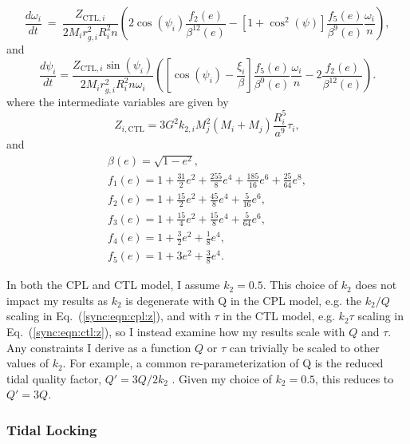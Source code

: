 \begin{equation}\label{sync:eqn:ctl:omega}
  \frac{d\omega_i}{dt} \ = \ \frac{Z_{\mathrm{CTL},i}}{2 M_i r_{g,i}^2 
R_i^2 n} \left( 2 \cos(\psi_i) \frac{f_2(e)}{\beta^{12}(e)} - \left[ 1+\cos^2(\psi)
 \right] \frac{f_5(e)}{\beta^9(e)} 
\frac{\omega_i}{n} \right),  
\end{equation}
and
\begin{equation}\label{sync:eqn:ctl:psi}
  \frac{d\psi_i}{dt} = \frac{Z_{\mathrm{CTL},i} \sin(\psi_i)}{2 M_i r_{g,i}^2 R_i^2 n \omega_i}\left( \left[ \cos(\psi_i) - \frac{\xi_i}{ \beta} \right] \frac{f_5(e)}{\beta^9(e)} \frac{\omega_i}{n} - 2 \frac{f_2(e)}{\beta^{12}(e)} \right).
\end{equation}
\normalsize
where the intermediate variables are given by 
\begin{equation}\label{sync:eqn:ctl:z}
 Z_{i,\mathrm{CTL}} = 3 G^2 k_{2,i} M_j^2 (M_i+M_j) \frac{R_i^5}{a^9} \tau_i ,
\end{equation}
and 
\begin{equation}\label{sync:eqn:ctl:f_e}
\begin{array}{l}
\beta(e) = \sqrt{1-e^2},\\
f_1(e) = 1 + \frac{31}{2} e^2 + \frac{255}{8} e^4 + \frac{185}{16} e^6 + \frac{25}{
64} e^8,\\
f_2(e) = 1 + \frac{15}{2} e^2 + \frac{45}{8} e^4 + \frac{5}{16} e^6,\\
f_3(e) = 1 + \frac{15}{4} e^2 + \frac{15}{8} e^4 + \frac{5}{64} e^6,\\
f_4(e) = 1 + \frac{3}{2} e^2 + \frac{1}{8} e^4,\\
f_5(e) = 1 + 3 e^2 + \frac{3}{8} e^4.
\end{array}
\end{equation}

In both the CPL and CTL model, I assume $k_2 = 0.5$. This choice of $k_2$ does not impact my results as $k_2$ is degenerate with Q in the CPL model, e.g. the $k_2/Q$ scaling in Eq.~(\ref{sync:eqn:cpl:z}), and with $\tau$ in the CTL model, e.g. $k_2 \tau$ scaling in Eq.~(\ref{sync:eqn:ctl:z}), so I instead examine how my results scale with $Q$ and $\tau$.  Any constraints I derive as a function $Q$ or $\tau$ can trivially be scaled to other values of $k_2$. For example, a common re-parameterization of Q is the reduced tidal quality factor, $Q' = 3Q/2k_2$ \citep[e.g.][]{Leconte2010}. Given my choice of $k_2 = 0.5$, this reduces to $Q' = 3 Q$.

\subsubsection{Tidal Locking}

